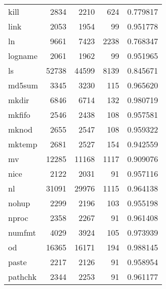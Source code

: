 \begin{tabular}{lrrrr}
kill      &                     2834 &         2210 &           624 &                 0.779817 \\
link      &                     2053 &         1954 &            99 &                 0.951778 \\
ln        &                     9661 &         7423 &          2238 &                 0.768347 \\
logname   &                     2061 &         1962 &            99 &                 0.951965 \\
ls        &                    52738 &        44599 &          8139 &                 0.845671 \\
md5sum    &                     3345 &         3230 &           115 &                 0.965620 \\
mkdir     &                     6846 &         6714 &           132 &                 0.980719 \\
mkfifo    &                     2546 &         2438 &           108 &                 0.957581 \\
mknod     &                     2655 &         2547 &           108 &                 0.959322 \\
mktemp    &                     2681 &         2527 &           154 &                 0.942559 \\
mv        &                    12285 &        11168 &          1117 &                 0.909076 \\
nice      &                     2122 &         2031 &            91 &                 0.957116 \\
nl        &                    31091 &        29976 &          1115 &                 0.964138 \\
nohup     &                     2299 &         2196 &           103 &                 0.955198 \\
nproc     &                     2358 &         2267 &            91 &                 0.961408 \\
numfmt    &                     4029 &         3924 &           105 &                 0.973939 \\
od        &                    16365 &        16171 &           194 &                 0.988145 \\
paste     &                     2217 &         2126 &            91 &                 0.958954 \\
pathchk   &                     2344 &         2253 &            91 &                 0.961177 \\

\end{tabular}
